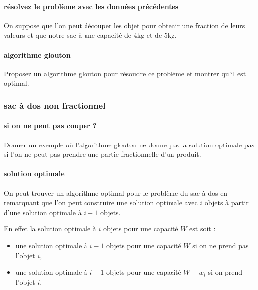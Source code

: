 \documentclass[
]{article}
\providecommand{\tightlist}{%
  \setlength{\itemsep}{0pt}\setlength{\parskip}{0pt}}
\begin{document}
\hypertarget{ruxe9solvez-le-probluxe8me-avec-les-donnuxe9es-pruxe9cuxe9dentes}{%
\paragraph{résolvez le problème avec les données
précédentes}\label{ruxe9solvez-le-probluxe8me-avec-les-donnuxe9es-pruxe9cuxe9dentes}}

On suppose que l'on peut découper les objet pour obtenir une fraction de
leurs valeurs et que notre sac à une capacité de 4kg et de 5kg.

\hypertarget{algorithme-glouton}{%
\paragraph{algorithme glouton}\label{algorithme-glouton}}

Proposez un algorithme glouton pour résoudre ce problème et montrer
qu'il est optimal.

\hypertarget{sac-uxe0-dos-non-fractionnel}{%
\subsubsection{sac à dos non
fractionnel}\label{sac-uxe0-dos-non-fractionnel}}

\hypertarget{si-on-ne-peut-pas-couper}{%
\paragraph{si on ne peut pas couper ?}\label{si-on-ne-peut-pas-couper}}

Donner un exemple où l'algorithme glouton ne donne pas la solution
optimale pas si l'on ne peut pas prendre une partie fractionnelle d'un
produit.

\hypertarget{solution-optimale}{%
\paragraph{solution optimale}\label{solution-optimale}}

On peut trouver un algorithme optimal pour le problème du sac à dos en
remarquant que l'on peut construire une solution optimale avec \(i\)
objets à partir d'une solution optimale à \(i-1\) objets.

En effet la solution optimale à \(i\) objets pour une capacité \(W\) est
soit :

\begin{itemize}
\tightlist
\item
  une solution optimale à \(i-1\) objets pour une capacité \(W\) si on
  ne prend pas l'objet \(i\),
\item
  une solution optimale à \(i-1\) objets pour une capacité \(W - w_i\)
  si on prend l'objet \(i\).
\end{itemize}
\end{document}
